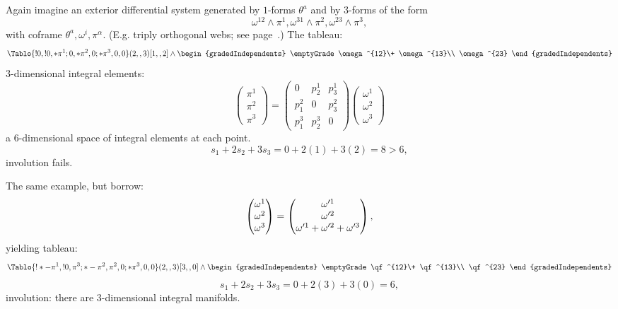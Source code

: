 \begin{example}
Again imagine an exterior differential system generated by \(1\)-forms \(\theta^a\) and by \(3\)-forms of the form
\[
\omega^{12}\wedge\pi^1, \omega^{31}\wedge\pi^2, \omega^{23}\wedge\pi^3,
\]
with coframe \(\theta^a,\omega^i,\pi^{\alpha}\).
(E.g. triply orthogonal webs; see page~\pageref{page:triply.orthogonal.web}.)
The tableau:
\[
\Tablo{!0,!0,*\pi^1;0,*\pi^2,0;*\pi^3,0,0}(2,,3)[1,,2]
\wedge
\begin{gradedIndependents}
\emptyGrade
\omega^{12}\+
\omega^{13}\\ \omega^{23}
\end{gradedIndependents}
\]
\(3\)-dimensional integral elements:
\[
\begin{pmatrix}
\pi^1 \\
\pi^2 \\
\pi^3
\end{pmatrix}
=
\begin{pmatrix}
0 & p^1_2 & p^1_3 \\
p^2_1 & 0 & p^2_3 \\
p^3_1 & p^3_2 & 0
\end{pmatrix}
\begin{pmatrix}
\omega^1\\
\omega^2\\
\omega^3
\end{pmatrix}
\]
a \(6\)-dimensional space of integral elements at each point.
\[
s_1+2s_2+3s_3=0+2(1)+3(2)=8>6,
\]
involution fails.
\end{example}
\begin{example}
The same example, but borrow:
\[
\begin{pmatrix}
\omega^1\\
\omega^2\\
\omega^3
\end{pmatrix}
=
\begin{pmatrix}
\omega'^1\\
\omega'^2\\
\omega'^1+\omega'^2+\omega'^3
\end{pmatrix},
\]
yielding tableau:
\[
\Tablo{!*-\pi^1,!0,\pi^3;*-\pi^2,\pi^2,0;*\pi^3,0,0}(2,,3)[3,,0]
\wedge
\begin{gradedIndependents}
\emptyGrade
\qf^{12}\+
\qf^{13}\\ 
\qf^{23}
\end{gradedIndependents}
\]
\[
s_1+2s_2+3s_3=0+2(3)+3(0)=6,
\]
involution: there are \(3\)-dimensional integral manifolds.
\end{example}


